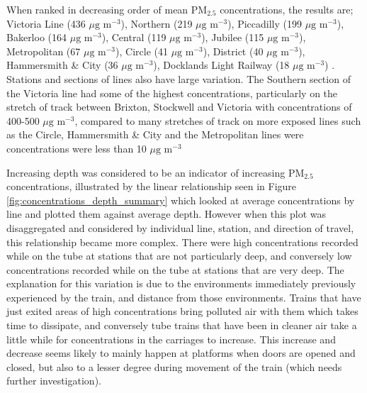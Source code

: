 
When ranked in decreasing order of mean PM$_{2.5}$ concentrations, the results are; Victoria Line (436 $\mu \text{g m}^{-3}$), Northern (219 $\mu \text{g m}^{-3}$), Piccadilly (199 $\mu \text{g m}^{-3}$), Bakerloo (164 $\mu \text{g m}^{-3}$), Central (119 $\mu \text{g m}^{-3}$), Jubilee (115 $\mu \text{g m}^{-3}$), Metropolitan (67 $\mu \text{g m}^{-3}$), Circle (41 $\mu \text{g m}^{-3}$), District (40 $\mu \text{g m}^{-3}$), Hammersmith \& City (36 $\mu \text{g m}^{-3}$), Docklands Light Railway (18 $\mu \text{g m}^{-3}$) . Stations and sections of lines also have large variation. The Southern section of the Victoria line had some of the highest concentrations, particularly on the stretch of track between Brixton, Stockwell and Victoria with concentrations of 400-500 $\mu \text{g m}^{-3}$, compared to many stretches of track on more exposed lines such as the Circle, Hammersmith \& City and the Metropolitan lines were concentrations were less than 10 $\mu \text{g m}^{-3}$


Increasing depth was considered to be an indicator of increasing PM$_{2.5}$ concentrations, illustrated by the linear relationship seen in Figure \ref{fig:concentrations_depth_summary} which looked at average concentrations by line and plotted them against average depth. However when this plot was disaggregated and considered by individual line, station, and direction of travel, this relationship became more complex. There were high concentrations recorded while on the tube at stations that are not particularly deep, and conversely low concentrations recorded while on the tube at stations that are very deep. The explanation for this variation is due to the environments immediately previously experienced by the train, and distance from those environments. Trains that have just exited areas of high concentrations bring polluted air with them which takes time to dissipate, and conversely tube trains that have been in cleaner air take a little while for concentrations in the carriages to increase. This increase and decrease seems likely to mainly happen at platforms when doors are opened and closed, but also to a lesser degree during movement of the train (which needs further investigation).


